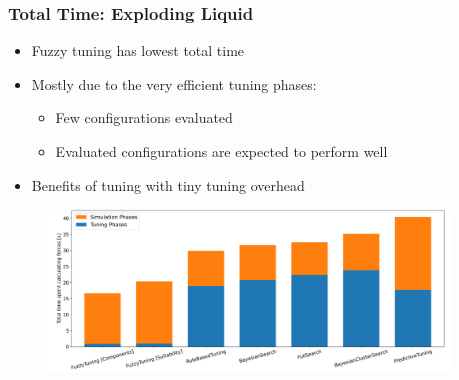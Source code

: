 \documentclass[
	10pt,
	t		%
]{beamer}
\begin{document}
\begin{frame}
	\frametitle{Total Time: Exploding Liquid}
	\begin{itemize}
		\item Fuzzy tuning has lowest total time
		\item Mostly due to the very efficient tuning phases:
		      \begin{itemize}
			      \item Few configurations evaluated
			      \item Evaluated configurations are expected to perform well
		      \end{itemize}
		\item Benefits of tuning with tiny tuning overhead
	\end{itemize}
	
	\begin{figure}
		\centering
		\includegraphics[width=0.95\textwidth]{figures/exploding-liquid-total.png}
	\end{figure}
\end{frame}
\end{document}
